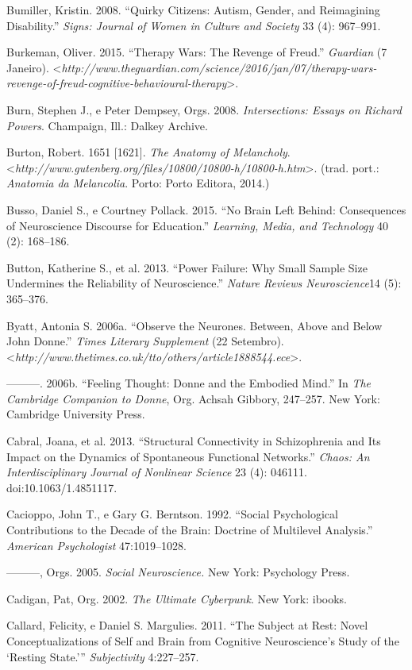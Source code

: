 Bumiller, Kristin. 2008. ``Quirky Citizens: Autism, Gender, and
Reimagining Disability.'' \emph{Signs: Journal of Women in Culture and
Society} 33 (4): 967--991.

Burkeman, Oliver. 2015. ``Therapy Wars: The Revenge of Freud.''
\emph{Guardian} (7 Janeiro).
\textless{}\emph{http://www.theguardian.com/science/2016/jan/07/therapy-wars-revenge-of-freud-cognitive-behavioural-therapy}\textgreater{}.

Burn, Stephen J., e Peter Dempsey, Orgs. 2008. \emph{Intersections:
Essays on Richard Powers}. Champaign, Ill.: Dalkey Archive.

Burton, Robert. 1651 {[}1621{]}. \emph{The Anatomy of Melancholy}.
\textless{}\emph{http://www.gutenberg.org/files/10800/10800-h/10800-h.htm}\textgreater{}. (trad.
port.: \emph{Anatomia da Melancolia}. Porto: Porto Editora, 2014.)

Busso, Daniel S., e Courtney Pollack. 2015. ``No Brain Left Behind:
Consequences of Neuroscience Discourse for Education.'' \emph{Learning,
Media, and Technology} 40 (2): 168--186.

Button, Katherine S., et al. 2013. ``Power Failure: Why Small Sample
Size Undermines the Reliability of Neuroscience.'' \emph{Nature Reviews
Neuroscience}14 (5): 365--376.

Byatt, Antonia S. 2006a. ``Observe the Neurones. Between, Above and
Below John Donne.'' \emph{Times Literary Supplement} (22 Setembro).
\textless{}\emph{http://www.thetimes.co.uk/tto/others/article1888544.ece}\textgreater{}.

---------. 2006b. ``Feeling Thought: Donne and the Embodied Mind.'' In
\emph{The Cambridge Companion to Donne}, Org. Achsah Gibbory, 247--257.
New York: Cambridge University Press.

Cabral, Joana, et al. 2013. ``Structural Connectivity in Schizophrenia
and Its Impact on the Dynamics of Spontaneous Functional Networks.''
\emph{Chaos: An Interdisciplinary Journal of Nonlinear Science} 23 (4):
046111. doi:10.1063/1.4851117.

Cacioppo, John T., e Gary G. Berntson. 1992. ``Social Psychological
Contributions to the Decade of the Brain: Doctrine of Multilevel
Analysis.'' \emph{American Psychologist} 47:1019--1028.

---------, Orgs. 2005. \emph{Social Neuroscience.} New York: Psychology
Press.

Cadigan, Pat, Org. 2002. \emph{The Ultimate Cyberpunk}. New York:
ibooks.

Callard, Felicity, e Daniel S. Margulies. 2011. ``The Subject at Rest:
Novel Conceptualizations of Self and Brain from Cognitive Neuroscience's
Study of the `Resting State.''' \emph{Subjectivity} 4:227--257.

